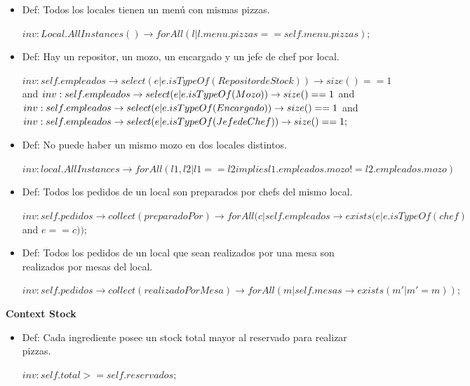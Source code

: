 \documentclass[a4paper,11pt] {article}
\begin{document}
\begin{itemize}
	\item Def: Todos los locales tienen un men\'u con mismas pizzas.
	
				$inv: Local.AllInstances()\rightarrow forAll(l | l.menu.pizzas == self.menu.pizzas);$
				
	\item	Def: Hay un repositor, un mozo, un encargado y un jefe de chef por local.
	
	$inv: self.empleados\rightarrow select(e | e.isTypeOf(Repositor de Stock))\rightarrow size() == 1 $ and $ \\
	inv: self.empleados\rightarrow select(e | e.isTypeOf(Mozo))\rightarrow size() == 1 $ and $	\\
	inv: self.empleados\rightarrow select(e | e.isTypeOf(Encargado))\rightarrow size() == 1 $ and $	\\
	inv: self.empleados\rightarrow select(e | e.isTypeOf(Jefe de Chef))\rightarrow size() == 1;$	\\

	\item	Def: No puede haber un mismo mozo en dos locales distintos.

$	inv: local.AllInstances\rightarrow forAll (l1, l2 |  l1  == l2 implies l1.empleados.mozo != l2.empleados.mozo)$	\\
	
	\item	Def: Todos los pedidos de un local son preparados por chefs del mismo local.
	
	$inv: self.pedidos\rightarrow collect(preparadoPor)\rightarrow forAll(c | self.empleados \rightarrow exists(e | e.isTypeOf(chef) $ and $e == c));$
	
	\item	Def: Todos los pedidos de un local que sean realizados por una mesa son realizados por mesas del local.
	
	$inv: self.pedidos\rightarrow collect(realizadoPorMesa)\rightarrow forAll(m | self.mesas\rightarrow exists(m' | m' = m));$
	
\end{itemize}

\textbf{Context Stock}

\begin{itemize}
	\item Def: Cada ingrediente posee un stock total mayor al reservado para realizar pizzas.
	
	$inv: self.total >= self.reservados;$
\end{itemize}
\end{document}
